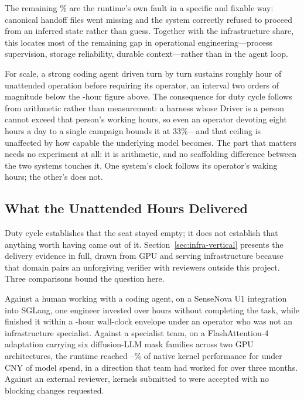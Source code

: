 The remaining \DutyContextPercent\% are the runtime's own fault in a specific and
fixable way: canonical handoff files went missing and the system correctly refused to
proceed from an inferred state rather than guess. Together with the infrastructure
share, this locates most of the remaining gap in operational engineering---process
supervision, storage reliability, durable context---rather than in the agent loop.

For scale, a strong coding agent driven turn by turn sustains roughly
\CodexEndurance{} hour of unattended operation before requiring its operator, an
interval two orders of magnitude below the \DutyInterval{}-hour figure above. The
consequence for duty cycle follows from arithmetic rather than measurement: a harness
whose Driver is a person cannot exceed that person's working hours, so even an
operator devoting eight hours a day to a single campaign bounds it at
33\%---and that ceiling is unaffected by how capable the underlying model becomes. The part
that matters needs no experiment at all: it is arithmetic, and no scaffolding
difference between the two systems touches it. One system's clock follows its
operator's waking hours; the other's does not.

\subsection{What the Unattended Hours Delivered}
\label{sec:delivery}

Duty cycle establishes that the seat stayed empty; it does not establish that
anything worth having came out of it. Section~\ref{sec:infra-vertical} presents the
delivery evidence in full, drawn from GPU and serving infrastructure because that
domain pairs an unforgiving verifier with reviewers outside this project. Three
comparisons bound the question here.

Against a human working with a coding agent, on a SenseNova U1 integration into
SGLang, one engineer invested over \SGLangHumanHours{} hours without completing the
task, while \systemname{} finished it within a \SGLangArgusHours{}-hour wall-clock
envelope under an operator who was not an infrastructure specialist. Against a
specialist team, on a FlashAttention-4 adaptation carrying six diffusion-LLM mask
families across two GPU architectures, the runtime reached
\FlashDAGapLow--\FlashDAGapHigh\% of native kernel performance for under
\FlashDACostCNY{} CNY of model spend, in a direction that team had worked for over
three months. Against an external reviewer, \FLAPRTotal{} kernels submitted to
 were accepted with no blocking changes requested.

